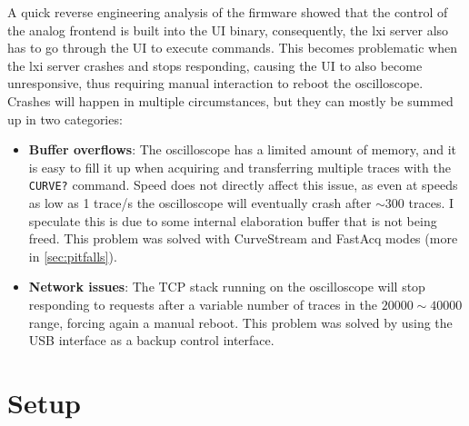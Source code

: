 \documentclass[a4paper,english,twoside,10pt]{article}
\begin{document}
A quick reverse engineering analysis of the firmware showed that the control of the analog frontend is built into the UI binary, consequently, the \gls{lxi} server also has to go through the UI to execute commands. This becomes problematic when the \gls{lxi} server crashes and stops responding, causing the UI to also become unresponsive, thus requiring manual interaction to reboot the oscilloscope. Crashes will happen in multiple circumstances, but they can mostly be summed up in two categories:
\begin{itemize}
	\item \textbf{Buffer overflows}: The oscilloscope has a limited amount of memory, and it is easy to fill it up when acquiring and transferring multiple traces with the \texttt{CURVE?} command. Speed does not directly affect this issue, as even at speeds as low as 1 trace/s the oscilloscope will eventually crash after \(\sim 300\) traces. I speculate this is due to some internal elaboration buffer that is not being freed. This problem was solved with CurveStream and FastAcq modes (more in \ref{sec:pitfalls}).
	\item \textbf{Network issues}: The TCP stack running on the oscilloscope will stop responding to requests after a variable number of traces in the \(20000\sim 40000\) range, forcing again a manual reboot. This problem was solved by using the USB interface as a backup control interface.
\end{itemize}

\section{Setup}
\end{document}

